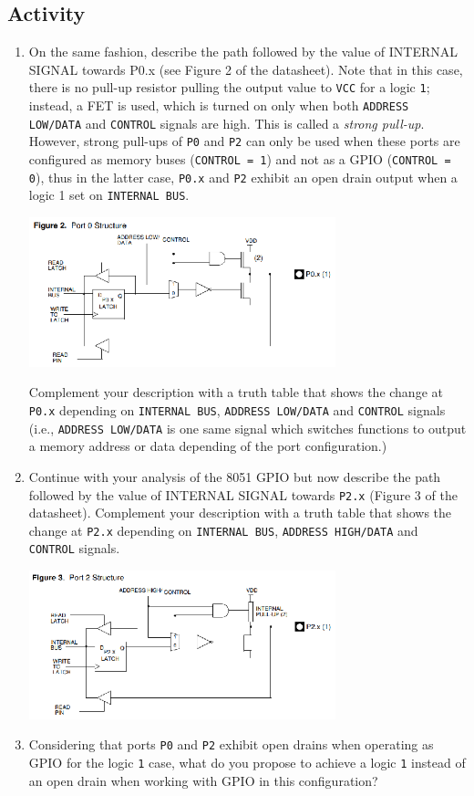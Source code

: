 \documentclass[10pt, letterpaper]{article}
\begin{document}
\subsection*{Activity}
\begin{enumerate}
\item On the same fashion, describe the path followed by the value of INTERNAL SIGNAL towards P0.x (see Figure 2 of the datasheet). Note that in this case, there is no pull-up resistor pulling the output value to \texttt{VCC} for a logic \texttt{1}; instead, a FET is used, which is turned on only when both \texttt{ADDRESS LOW/DATA} and \texttt{CONTROL} signals are high. This is called a \emph{strong pull-up}. However, strong pull-ups of \texttt{P0} and \texttt{P2} can only be used when these ports are configured as memory buses (\texttt{CONTROL = 1}) and not as a GPIO (\texttt{CONTROL = 0}), thus in the latter case, \texttt{P0.x} and \texttt{P2} exhibit an open drain output when a logic 1 set on \texttt{INTERNAL BUS}.

\begin{center}
	\includegraphics[width=0.7\textwidth]{img/fig02.eps}
\end{center}

Complement your description with a truth table that shows the change at \texttt{P0.x} depending on \texttt{INTERNAL BUS}, \texttt{ADDRESS LOW/DATA} and \texttt{CONTROL} signals (i.e., \texttt{ADDRESS LOW/DATA} is one same signal which switches functions to output a memory address or data depending of the port configuration.)

\item Continue with your analysis of the 8051 GPIO but now describe the path followed by the value of INTERNAL SIGNAL towards \texttt{P2.x} (Figure 3 of the datasheet). Complement your description with a truth table that shows the change at \texttt{P2.x} depending on \texttt{INTERNAL BUS}, \texttt{ADDRESS HIGH/DATA} and \texttt{CONTROL} signals.
\begin{center}
	\includegraphics[width=0.7\textwidth]{img/fig03.eps}
\end{center}

\item Considering that ports \texttt{P0} and \texttt{P2} exhibit open drains when operating as GPIO for the logic \texttt{1} case, what do you propose to achieve a logic \texttt{1} instead of an open drain when working with GPIO in this configuration?
\end{enumerate}
\end{document}
